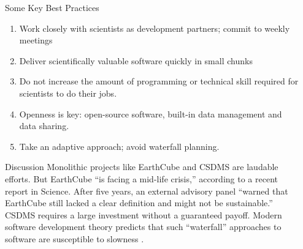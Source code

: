 \documentclass[final]{beamer}
\newlength{\sepwid}
\newlength{\onecolwid}
\begin{document}
\begin{frame}[t]
\begin{columns}[t]
\begin{column}{\sepwid}\end{column} %

\begin{column}{\onecolwid} %


\begin{block}{Some Key Best Practices}
    \begin{enumerate}
        \item{Work closely with scientists as development partners; commit to weekly meetings}
        \item{Deliver scientifically valuable software quickly in small chunks}
        \item{Do not increase the amount of programming or technical skill required for scientists to do their jobs.}
        \item{Openness is key: open-source software, built-in data management and data sharing.}
        \item{Take an adaptive approach; avoid waterfall planning.}
    \end{enumerate}
\end{block}

\begin{block}{Discussion}
    Monolithic projects like EarthCube and CSDMS are laudable efforts. But 
    EarthCube ``is facing a mid-life crisis,''
    according to a recent report in Science. After five years, an external 
    advisory panel ``warned that EarthCube
    still lacked a clear definition and might not be sustainable\cite{Witze2016}.''
    CSDMS requires a large investment without a guaranteed payoff.
    Modern software development theory predicts that such ``waterfall'' 
    approaches to software are susceptible to slowness \cite{Sutherland2014}.
\end{block}


%
%


\end{column}
\end{columns}
\end{frame}
\end{document}

